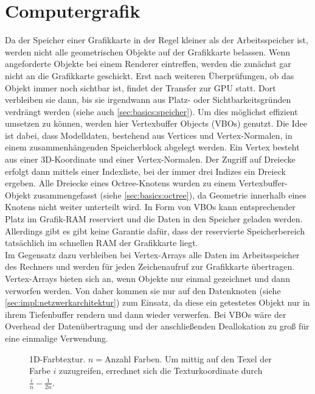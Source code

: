 \section{Computergrafik}
\label{sec:basics:computergrafik}
Da der Speicher einer Grafikkarte in der Regel kleiner als der Arbeitsspeicher ist, werden nicht alle geometrischen Objekte auf der Grafikkarte belassen. Wenn angeforderte Objekte bei einem Renderer eintreffen, werden die zunächst gar nicht an die Grafikkarte geschickt. Erst nach weiteren Überprüfungen, ob das Objekt immer noch sichtbar ist, findet der Transfer zur GPU statt. Dort verbleiben sie dann, bis sie irgendwann aus Platz- oder Sichtbarkeitsgründen verdrängt werden (siehe auch \ref{sec:basics:speicher}). Um dies möglichst effizient umsetzen zu können, werden hier Vertexbuffer Objects (VBOs) genutzt. Die Idee ist dabei, dass Modelldaten, bestehend aus Vertices und Vertex-Normalen, in einem zusammenhängenden Speicherblock abgelegt werden. Ein Vertex besteht aus einer 3D-Koordinate und einer Vertex-Normalen. Der Zugriff auf Dreiecke erfolgt dann mittels einer Indexliste, bei der immer drei Indizes ein Dreieck ergeben. Alle Dreiecke eines Octree-Knotens wurden zu einem Vertexbuffer-Objekt zusammengefasst (siehe \ref{sec:basics:octree}), da Geometrie innerhalb eines Knotens nicht weiter unterteilt wird. In Form von VBOs kann entsprechender Platz im Grafik-RAM reserviert und die Daten in den Speicher geladen werden. Allerdings gibt es gibt keine Garantie dafür, dass der reservierte Speicherbereich tatsächlich im schnellen RAM der Grafikkarte liegt.\\
Im Gegensatz dazu verbleiben bei Vertex-Arrays alle Daten im Arbeitsspeicher des Rechners und werden für jeden Zeichenaufruf zur Grafikkarte übertragen. Vertex-Arrays bieten sich an, wenn Objekte nur einmal gezeichnet und dann verworfen werden. Von daher kommen sie nur auf den Datenknoten (siehe \ref{sec:impl:netzwerkarchitektur}) zum Einsatz, da diese ein getestetes Objekt nur in ihrem Tiefenbuffer rendern und dann wieder verwerfen. Bei VBOs wäre der Overhead der Datenübertragung und der anschließenden Deallokation zu groß für eine einmalige Verwendung.
\begin{figure}
  \centering
  
  \caption{1D-Farbtextur. $n=$Anzahl Farben. Um mittig auf den Texel der Farbe $i$ zuzugreifen, errechnet sich die Texturkoordinate durch $\frac{i}{n}-\frac{1}{2n}$. }
  \label{fig:basics:1dtexture}
\end{figure}

